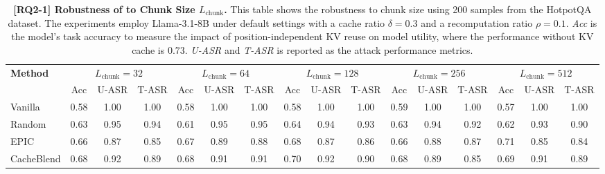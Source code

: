\begin{table}[t]
\centering
\footnotesize
\caption{\textbf{[RQ2-1] Robustness of \sys to Chunk Size $L_\mathrm{chunk}$.} This table shows the robustness to chunk size using 200 samples from the HotpotQA dataset. The experiments employ Llama-3.1-8B under default settings with a cache ratio $\delta = 0.3$ and a recomputation ratio $\rho = 0.1$. \textit{Acc} is the model's task accuracy to measure the impact of position-independent KV reuse on model utility, where the performance without KV cache is 0.73. \textit{U-ASR} and \textit{T-ASR} is reported as the attack performance metrics.}
\label{tab:rq2_asr_vs_chunk_size}
\setlength{\tabcolsep}{0pt} 
\begin{tabular*}{\textwidth}{@{\extracolsep{\fill}} l ccc ccc ccc ccc ccc }
\toprule
\multirow{2}{*}{\textbf{Method}} & \multicolumn{3}{c}{$L_\mathrm{chunk} = 32$} & \multicolumn{3}{c}{$L_\mathrm{chunk} = 64$} & \multicolumn{3}{c}{$L_\mathrm{chunk} = 128$} & \multicolumn{3}{c}{$L_\mathrm{chunk} = 256$} & \multicolumn{3}{c}{$L_\mathrm{chunk} = 512$} \\
\cmidrule(lr){2-4} \cmidrule(lr){5-7} \cmidrule(lr){8-10} \cmidrule(lr){11-13} \cmidrule(lr){14-16}
 & Acc & U-ASR & T-ASR & Acc & U-ASR & T-ASR & Acc & U-ASR & T-ASR & Acc & U-ASR & T-ASR & Acc & U-ASR & T-ASR \\
\midrule
Vanilla     & 0.58 & 1.00 & 1.00 & 0.58 & 1.00 & 1.00 & 0.58 & 1.00 & 1.00 & 0.59 & 1.00 & 1.00 & 0.57 & 1.00 & 1.00 \\
Random      & 0.63 & 0.95 & 0.94 & 0.61 & 0.95 & 0.95 & 0.64 & 0.94 & 0.93 & 0.63 & 0.94 & 0.92 & 0.62 & 0.93 & 0.90 \\
EPIC        & 0.66 & 0.87 & 0.85 & 0.67 & 0.89 & 0.88 & 0.68 & 0.87 & 0.86 & 0.66 & 0.88 & 0.87 & 0.71 & 0.85 & 0.84 \\
CacheBlend  & 0.68 & 0.92 & 0.89 & 0.68 & 0.91 & 0.91 & 0.70 & 0.92 & 0.90 & 0.68 & 0.89 & 0.85 & 0.69 & 0.91 & 0.89 \\
\bottomrule
\end{tabular*}
\end{table}
